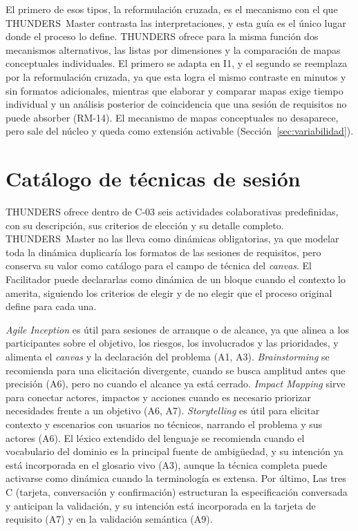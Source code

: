 \documentclass[12pt,letterpaper,oneside]{report}
\begin{document}
El primero de esos tipos, la reformulación cruzada, es el mecanismo con el que
THUNDERS~Master contrasta las interpretaciones, y esta guía es el único lugar
donde el proceso lo define. THUNDERS ofrece para la misma función dos mecanismos
alternativos, las listas por dimensiones y la comparación de mapas conceptuales
individuales. El primero se adapta en I1, y el segundo se reemplaza por la
reformulación cruzada, ya que esta logra el mismo contraste en minutos y sin
formatos adicionales, mientras que elaborar y comparar mapas exige tiempo
individual y un análisis posterior de coincidencia que una sesión de requisitos
no puede absorber (RM-14). El mecanismo de mapas conceptuales no desaparece,
pero sale del núcleo y queda como extensión activable
(Sección~\ref{sec:variabilidad}).

\section{Catálogo de técnicas de sesión}
\label{sec:catalogo-v13}
THUNDERS ofrece dentro de C-03 seis actividades colaborativas predefinidas, con
su descripción, sus criterios de elección y su detalle completo.
THUNDERS~Master no las lleva como dinámicas obligatorias, ya que modelar toda la
dinámica duplicaría los formatos de las sesiones de requisitos, pero conserva su
valor como catálogo para el campo de técnica del \textit{canvas}. El Facilitador
puede declararlas como dinámica de un bloque cuando el contexto lo amerita,
siguiendo los criterios de elegir y de no elegir que el proceso original define
para cada una.

\textit{Agile Inception} es útil para sesiones de arranque o de alcance, ya que
alinea a los participantes sobre el objetivo, los riesgos, los involucrados y
las prioridades, y alimenta el \textit{canvas} y la declaración del problema (A1,
A3). \textit{Brainstorming} se recomienda para una elicitación divergente,
cuando se busca amplitud antes que precisión (A6), pero no cuando el alcance ya
está cerrado. \textit{Impact Mapping} sirve para conectar actores, impactos y
acciones cuando es necesario priorizar necesidades frente a un objetivo (A6,
A7). \textit{Storytelling} es útil para elicitar contexto y escenarios con
usuarios no técnicos, narrando el problema y sus actores (A6). El léxico
extendido del lenguaje se recomienda cuando el vocabulario del dominio es la
principal fuente de ambigüedad, y su intención ya está incorporada en el
glosario vivo (A3), aunque la técnica completa puede activarse como dinámica
cuando la terminología es extensa.
Por último, Las tres C (tarjeta, conversación y confirmación) estructuran la
especificación conversada y anticipan la validación, y su intención está
incorporada en la tarjeta de requisito (A7) y en la validación semántica (A9).
\end{document}
